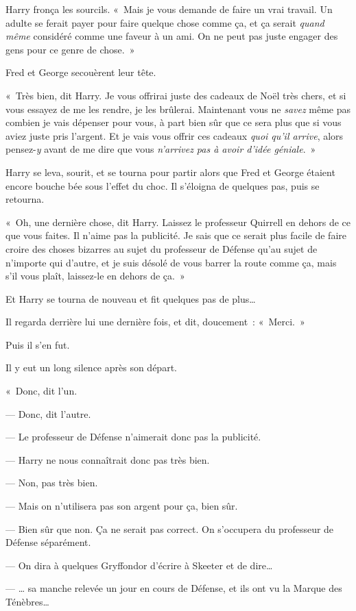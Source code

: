 Harry fronça les sourcils. «~Mais je vous demande de faire un vrai travail. Un adulte se ferait payer pour faire quelque chose comme ça, et ça serait \emph{quand même} considéré comme une faveur à un ami. On ne peut pas juste engager des gens pour ce genre de chose.~»

Fred et George secouèrent leur tête.

«~Très bien, dit Harry. Je vous offrirai juste des cadeaux de Noël très chers, et si vous essayez de me les rendre, je les brûlerai. Maintenant vous ne \emph{savez} même pas combien je vais dépenser pour vous, à part bien sûr que ce sera plus que si vous aviez juste pris l'argent. Et je vais vous offrir ces cadeaux \emph{quoi qu'il arrive}, alors pensez-\emph{y} avant de me dire que vous \emph{n'arrivez pas à avoir d'idée géniale}.~»

Harry se leva, sourit, et se tourna pour partir alors que Fred et George étaient encore bouche bée sous l'effet du choc. Il s'éloigna de quelques pas, puis se retourna.

«~Oh, une dernière chose, dit Harry. Laissez le professeur Quirrell en dehors de ce que vous faites. Il n'aime pas la publicité. Je sais que ce serait plus facile de faire croire des choses bizarres au sujet du professeur de Défense qu'au sujet de n'importe qui d'autre, et je suis désolé de vous barrer la route comme ça, mais s'il vous plaît, laissez-le en dehors de ça.~»

Et Harry se tourna de nouveau et fit quelques pas de plus…

Il regarda derrière lui une dernière fois, et dit, doucement~: «~Merci.~»

Puis il s'en fut.

Il y eut un long silence après son départ.

«~Donc, dit l'un.

--- Donc, dit l'autre.

--- Le professeur de Défense n'aimerait donc pas la publicité.

--- Harry ne nous connaîtrait donc pas très bien.

--- Non, pas très bien.

--- Mais on n'utilisera pas son argent pour ça, bien sûr.

--- Bien sûr que non. Ça ne serait pas correct. On s'occupera du professeur de Défense séparément.

--- On dira à quelques Gryffondor d'écrire à Skeeter et de dire…

--- … sa manche relevée un jour en cours de Défense, et ils ont vu la Marque des Ténèbres…

